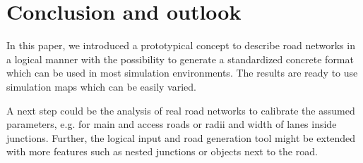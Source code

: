 \documentclass[a4paper, 10pt, conference]{ieeeconf}      %
\begin{document}
\section{Conclusion and outlook} %
In this paper, we introduced a prototypical concept to describe road networks in a logical manner with the possibility to generate a standardized concrete format which can be used in most simulation environments.
The results are ready to use simulation maps which can be easily varied.

A next step could be the analysis of real road networks to calibrate the assumed parameters, e.g. for main and access roads or radii and width of lanes inside junctions.
Further, the logical input and road generation tool might be extended with more features such as nested junctions or objects next to the road.












\end{document}
